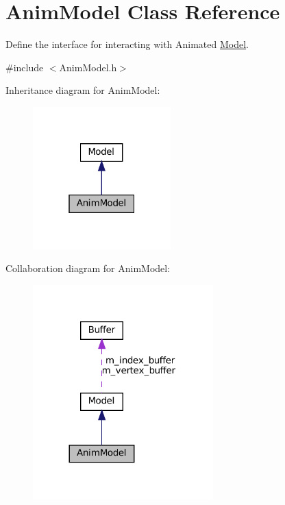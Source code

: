 \hypertarget{classAnimModel}{}\section{Anim\+Model Class Reference}
\label{classAnimModel}


Define the interface for interacting with Animated \hyperlink{classModel}{Model}.  




{\ttfamily \#include $<$Anim\+Model.\+h$>$}



Inheritance diagram for Anim\+Model\+:
\nopagebreak
\begin{figure}[H]
\begin{center}
\leavevmode
\includegraphics[width=151pt]{classAnimModel__inherit__graph}
\end{center}
\end{figure}


Collaboration diagram for Anim\+Model\+:
\nopagebreak
\begin{figure}[H]
\begin{center}
\leavevmode
\includegraphics[width=197pt]{classAnimModel__coll__graph}
\end{center}
\end{figure}

